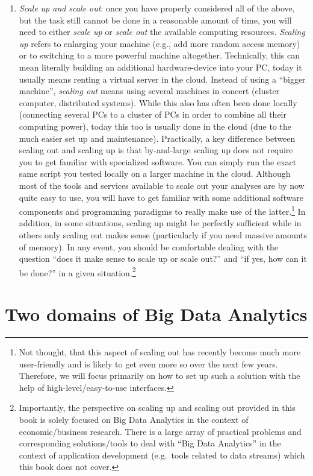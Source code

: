 \documentclass[
  12pt,
]{style/krantz}
\begin{document}
\begin{enumerate}
\item
  \emph{Scale up and scale out}: once you have properly considered all of the above, but the task still cannot be done in a reasonable amount of time, you will need to either \emph{scale up} or \emph{scale out} the available computing resources. \emph{Scaling up} refers to enlarging your machine (e.g., add more random access memory) or to switching to a more powerful machine altogether. Technically, this can mean literally building an additional hardware-device into your PC, today it usually means renting a virtual server in the cloud. Instead of using a ``bigger machine'', \emph{scaling out} means using several machines in concert (cluster computer, distributed systems). While this also has often been done locally (connecting several PCs to a cluster of PCs in order to combine all their computing power), today this too is usually done in the cloud (due to the much easier set up and maintenance). Practically, a key difference between scaling out and scaling up is that by-and-large scaling up does not require you to get familiar with specialized software. You can simply run the exact same script you tested locally on a larger machine in the cloud. Although most of the tools and services available to scale out your analyses are by now quite easy to use, you will have to get familiar with some additional software components and programming paradigms to really make use of the latter.\footnote{Not thought, that this aspect of scaling out has recently become much more user-friendly and is likely to get even more so over the next few years. Therefore, we will focus primarily on how to set up such a solution with the help of high-level/easy-to-use interfaces.} In addition, in some situations, scaling up might be perfectly sufficient while in others only scaling out makes sense (particularly if you need massive amounts of memory). In any event, you should be comfortable dealing with the question ``does it make sense to scale up or scale out?'' and ``if yes, how can it be done?'' in a given situation.\footnote{Importantly, the perspective on scaling up and scaling out provided in this book is solely focused on Big Data Analytics in the context of economic/business research. There is a large array of practical problems and corresponding solutions/tools to deal with ``Big Data Analytics'' in the context of application development (e.g.~tools related to data streams) which this book does not cover.}
\end{enumerate}

\hypertarget{two-domains-of-big-data-analytics}{%
\chapter{Two domains of Big Data Analytics}\label{two-domains-of-big-data-analytics}}
\end{document}
